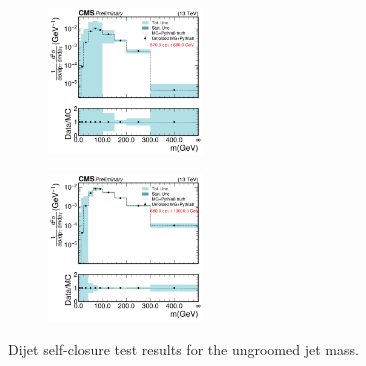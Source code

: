 \begin{figure}[htp!]
\begin{subfigure}
          \centering
          \includegraphics[width=0.45\textwidth]{figures/multijet/unfolding/dijet/closure_binnedResult_ungroomed_3.pdf}
        \end{subfigure}
        \begin{subfigure}
          \centering
          \includegraphics[width=0.45\textwidth]{figures/multijet/unfolding/dijet/closure_binnedResult_ungroomed_4.pdf}
        \end{subfigure}
        \caption{Dijet self-closure test results for the ungroomed jet mass.}
	\label{fig:dijetclosurebinned_u}
      \end{figure}


